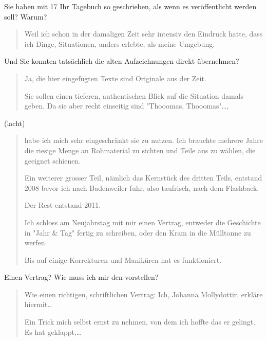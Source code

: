 \documentclass[10pt,titlepage,a5paper]{book}
\newenvironment{tg}{\begin{quote}\em}{\end{quote}}
\begin{document}
Sie haben mit 17 Ihr Tagebuch so geschrieben, als wenn es ver\-öffentlicht werden soll? Warum?

\begin{tg}

Weil ich schon in der damaligen Zeit sehr intensiv den Eindruck hatte, dass ich Dinge, Situationen, anders erlebte, als meine Umgebung.

\end{tg}

Und Sie konnten tatsächlich die alten Aufzeichnungen direkt über\-nehmen?

\begin{tg}

Ja, die hier eingefügten Texte sind Originale aus der Zeit.

Sie sollen einen tieferen, authentischen Blick auf die Situation damals geben. Da sie aber recht einseitig sind "Thooomas, Thooomas"{}\dots ,

\end{tg}

(lacht)

\begin{tg}
 
 habe ich mich sehr eingeschränkt sie zu nutzen. Ich brauchte mehrere Jahre die riesige Menge an Rohmaterial zu sichten und Teile aus zu wählen, die geeignet schienen.

Ein weiterer grosser Teil, nämlich das Kernstück des dritten Teils, entstand 2008 bevor ich nach Badenweiler fuhr, also taufrisch, nach dem Flashback.

Der Rest entstand 2011.

 Ich schloss am Neujahrstag mit mir einen Vertrag, entweder die Geschichte in "Jahr \& Tag"{} fertig zu schreiben, oder den Kram in die Mülltonne zu werfen.

Bis auf einige Korrekturen und Maniküren hat es funktioniert.

 \end{tg}
 
 Einen Vertrag? Wie muss ich mir den vorstellen?
 
 \begin{tg}
 
 Wie einen richtigen, schriftlichen Vertrag: Ich, Johanna Mollydottir, erkläre hiermit\dots
 
 Ein Trick mich selbst ernst zu nehmen, von dem ich hoffte das er gelingt. Es hat geklappt,\dots 
 
 \end{tg}
 
\end{document}
